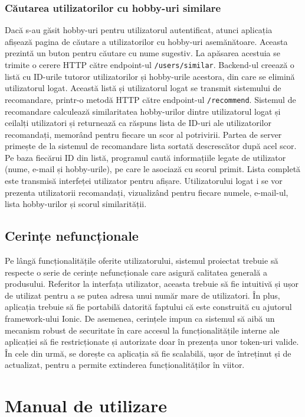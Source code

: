 \subsubsection*{Căutarea utilizatorilor cu hobby-uri similare}
Dacă s-au găsit hobby-uri pentru utilizatorul autentificat, atunci aplicația afișează pagina de căutare a utilizatorilor cu hobby-uri asemănătoare.
Aceasta prezintă un buton pentru căutare cu nume sugestiv. 
La apăsarea acestuia se trimite o cerere HTTP către endpoint-ul \texttt{/users/similar}.
Backend-ul creează o listă cu ID-urile tutoror utilizatorilor și hobby-urile acestora, din care se elimină utilizatorul logat.
Această listă și utilizatorul logat se transmit sistemului de recomandare, printr-o metodă HTTP către endpoint-ul \texttt{/recommend}.
Sistemul de recomandare calculează similaritatea hobby-urilor dintre utilizatorul logat și ceilalți utilizatori și returnează ca răspuns lista de ID-uri ale utilizatorilor recomandați, memorând pentru fiecare un scor al potrivirii.
Partea de server primește de la sistemul de recomandare lista sortată descrescător după acel scor. 
Pe baza fiecărui ID din listă, programul caută informațiile legate de utilizator (nume, e-mail și hobby-urile), pe care le asociază cu scorul primit.
Lista completă este transmisă interfeței utilizator pentru afișare.
Utilizatorului logat i se vor prezenta utilizatorii recomandați, vizualizând pentru fiecare numele, e-mail-ul, lista hobby-urilor și scorul similarității.


\subsection{Cerințe nefuncționale}
\label{subsec:ch4sec2sub2}
Pe lângă funcționalitățile oferite utilizatorului, sistemul proiectat trebuie să respecte o serie de cerințe nefuncționale care asigură calitatea generală a produsului.
Referitor la interfața utilizator, aceasta trebuie să fie intuitivă și ușor de utilizat pentru a se putea adresa unui număr mare de utilizatori.
În plus, aplicația trebuie să fie portabilă datorită faptului că este construită cu ajutorul framework-ului Ionic.
De asemenea, cerințele impun ca sistemul să aibă un mecanism robust de securitate în care accesul la funcționalitățile interne ale aplicației să fie restricționate și autorizate doar în prezența unor token-uri valide. 
În cele din urmă, se dorește ca aplicația să fie scalabilă, ușor de întreținut și de actualizat, pentru a permite extinderea funcționalităților în viitor. 


\section{Manual de utilizare}
\label{sec:ch4sec3}

